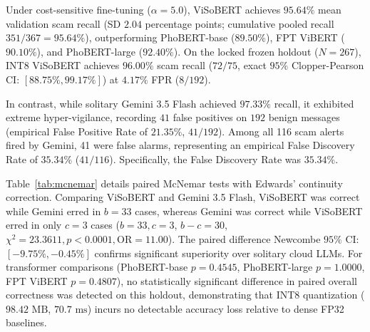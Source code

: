 Under cost-sensitive fine-tuning ($\alpha=5.0$), ViSoBERT achieves $95.64\%$ mean validation scam recall (SD $2.04$ percentage points; cumulative pooled recall $351/367 = 95.64\%$), outperforming PhoBERT-base ($89.50\%$), FPT ViBERT ($90.10\%$), and PhoBERT-large ($92.40\%$). On the locked frozen holdout ($N=267$), INT8 ViSoBERT achieves $96.00\%$ scam recall ($72/75$, exact $95\%$ Clopper-Pearson CI: $[88.75\%, 99.17\%]$) at $4.17\%$ FPR ($8/192$).

In contrast, while solitary Gemini 3.5 Flash achieved $97.33\%$ recall, it exhibited extreme hyper-vigilance, recording $41$ false positives on $192$ benign messages (empirical False Positive Rate of $21.35\%$, $41/192$). Among all 116 scam alerts fired by Gemini, 41 were false alarms, representing an empirical False Discovery Rate of $35.34\%$ ($41/116$). Specifically, the False Discovery Rate was $35.34\%$.

\begin{table}[h]
\centering
\caption{Paired McNemar Test Analysis across Model Configurations ($\alpha=0.05$)}
\label{tab:mcnemar}
\renewcommand{\arraystretch}{0.92}
\end{table}

Table~\ref{tab:mcnemar} details paired McNemar tests with Edwards' continuity correction. Comparing ViSoBERT and Gemini 3.5 Flash, ViSoBERT was correct while Gemini erred in $b = 33$ cases, whereas Gemini was correct while ViSoBERT erred in only $c = 3$ cases ($b=33, c=3$, $b - c = 30$, $\chi^2 = 23.3611, p < 0.0001, \text{OR} = 11.00$). The paired difference Newcombe $95\%$ CI: $[-9.75\%, -0.45\%]$ confirms significant superiority over solitary cloud LLMs. For transformer comparisons (PhoBERT-base $p=0.4545$, PhoBERT-large $p=1.0000$, FPT ViBERT $p=0.4807$), no statistically significant difference in paired overall correctness was detected on this holdout, demonstrating that INT8 quantization ($98.42\text{ MB}$, $70.7\text{ ms}$) incurs no detectable accuracy loss relative to dense FP32 baselines.

